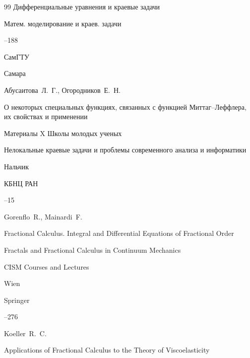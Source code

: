 \begin{thebibliography}{99}
\bookinfo Дифференциальные уравнения и краевые задачи

\serial Матем. моделирование и краев. задачи


--188

\publ СамГТУ

\publaddr Самара







\by Абусаитова~Л.~Г., Огородников~Е.~Н.

\paper О некоторых специальных функциях, связанных с функцией Миттаг--Леффлера, их свойствах и применении

\bookinfo Материалы X Школы молодых ученых 

\inbook Нелокальные краевые задачи и проблемы современного анализа и информатики

\publaddr Нальчик

\publ  КБНЦ РАН


--15








\by Gorenflo~R., Mainardi~F.

\paper Fractional Calculus. Integral and Differential Equations of Fractional Order

\inbook Fractals and Fractional Calculus in Continuum Mechanics

\serial  CISM Courses and Lectures


\publaddr Wien

\publ  Springer


--276








\by Koeller~R.~C.

\paper Applications of Fractional Calculus to the Theory of Viscoelasticity


\end{thebibliography}
